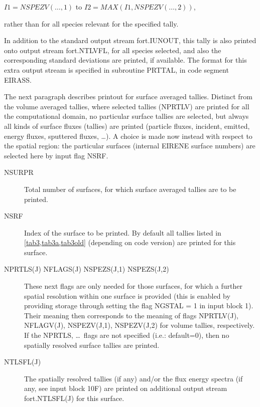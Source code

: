 \begin{description}
        $I1 = NSPEZV(\dots,1)$ to $I2 = MAX(I1,NSPEZV(\dots,2))$, 

        rather than for all species relevant for the specified tally.
  \item[NTLVFL] In addition to the standard output stream fort.IUNOUT, this tally
        is also printed onto output stream fort.NTLVFL, for all species selected, and
        also the corresponding standard deviations are printed, if available.
        The format for this extra output stream is specified in subroutine PRTTAL, in
        code segment EIRASS.
\end{description}
The next paragraph describes printout for surface averaged tallies.
Distinct from the volume averaged tallies, where selected tallies (NPRTLV) are
printed for all the computational domain, no particular surface tallies are
selected, but always all kinds of surface fluxes (tallies) are printed
(particle fluxes, incident, emitted, energy fluxes, sputtered fluxes, \dots).
A choice is made now instead with respect to the spatial region:
the particular surfaces (internal EIRENE surface
numbers) are selected here by input flag NSRF.

\begin{description}
  \item[NSURPR] Total number of surfaces, for which surface averaged tallies are
        to be printed.
  \item[NSRF] Index of the surface to be printed.
        By default all tallies listed in \cref{tab3,tab3a,tab3old} (depending on code
        version) are printed for this surface.
  \item[NPRTLS(J) NFLAGS(J) NSPEZS(J,1) NSPEZS(J,2)] These next flags are only
        needed for those surfaces, for which a further spatial resolution within one
        surface is provided (this is enabled by providing storage through setting the
        flag NGSTAL = 1 in input block 1).
        Their meaning then corresponds to the meaning of flags NPRTLV(J), NFLAGV(J),
        NSPEZV(J,1), NSPEZV(J,2) for volume tallies, respectively.
        If the NPRTLS, \dots\ flags are not specified (i.e.: default=0), then no
        spatially resolved surface tallies are printed.
  \item[NTLSFL(J)] The spatially resolved tallies (if any) and/or the flux energy
        spectra (if any, see input block 10F) are printed on additional output stream
        fort.NTLSFL(J) for this surface.
\end{description}

